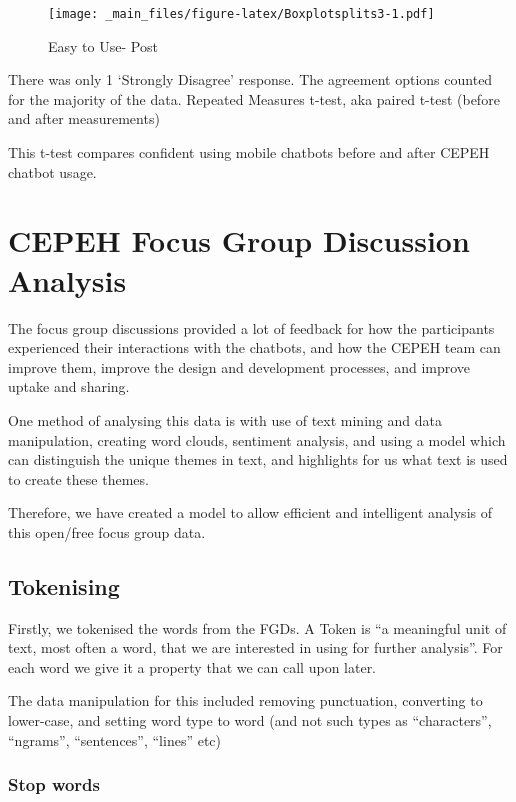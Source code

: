 \documentclass[a4paper, nobind]{templates/ociamthesis}
\begin{document}
\begin{figure}
\centering
\texttt{[image: \_main\_files/figure-latex/Boxplotsplits3-1.pdf]}
\caption{\label{fig:Boxplotsplits3}Easy to Use- Post}
\end{figure}

There was only 1 `Strongly Disagree' response. The agreement options
counted for the majority of the data.
Repeated Measures t-test, aka paired t-test (before and after
measurements)

This t-test compares confident using mobile chatbots before and after
CEPEH chatbot usage.

\hypertarget{cepeh-focus-group-discussion-analysis}{%
\chapter{CEPEH Focus Group Discussion Analysis}\label{cepeh-focus-group-discussion-analysis}}

The focus group discussions provided a lot of feedback for how the
participants experienced their interactions with the chatbots, and how
the CEPEH team can improve them, improve the design and development
processes, and improve uptake and sharing.

One method of analysing this data is with use of text mining and data
manipulation, creating word clouds, sentiment analysis, and using a
model which can distinguish the unique themes in text, and highlights
for us what text is used to create these themes.

Therefore, we have created a model to allow efficient and intelligent
analysis of this open/free focus group data.

\hypertarget{tokenising}{%
\section{Tokenising}\label{tokenising}}

Firstly, we tokenised the words from the FGDs. A Token is ``a meaningful
unit of text, most often a word, that we are interested in using for
further analysis''. For each word we give it a property that we can call
upon later.

The data manipulation for this included removing punctuation, converting
to lower-case, and setting word type to word (and not such types as
``characters'', ``ngrams'', ``sentences'', ``lines'' etc)

\hypertarget{stop-words}{%
\subsection{Stop words}\label{stop-words}}
\end{document}
